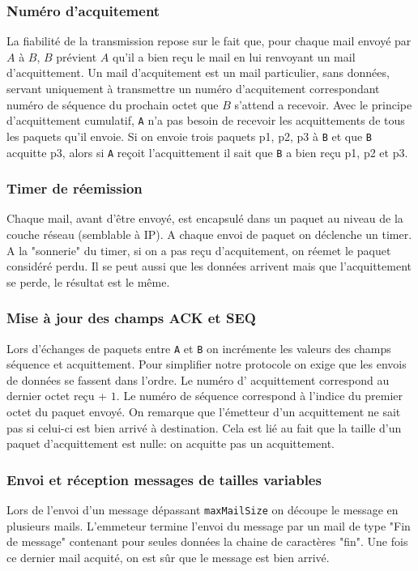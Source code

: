 \documentclass[11pt]{article}
\theoremstyle{definition}
\theoremstyle{definition}
\begin{document}
\subsubsection{Numéro d'acquitement}
La fiabilité de la transmission repose sur le fait que, pour chaque mail envoyé par $A$ à $B$, $B$ prévient $A$ qu'il a bien reçu le mail en lui renvoyant un mail d'acquittement.
Un mail d'acquitement est un mail particulier, sans données, servant uniquement à transmettre un numéro d'acquitement correspondant numéro de séquence du prochain octet que $B$ s'attend a recevoir.
Avec le principe d'acquittement cumulatif, \texttt{A} n'a pas besoin de recevoir les acquittements de tous les paquets qu'il envoie. Si on envoie trois paquets p1, p2, p3 à \texttt{B} et que \texttt{B}
acquitte p3, alors si \texttt{A} reçoit l'acquittement il sait que \texttt{B} a bien reçu p1, p2 et p3.

\subsubsection{Timer de réemission}
Chaque mail, avant d'être envoyé, est encapsulé dans un paquet au niveau de la couche réseau (semblable à IP).
A chaque envoi de paquet on déclenche un timer.
A la "sonnerie" du timer, si on a pas reçu d'acquitement, on réemet le paquet considéré perdu.
Il se peut aussi que les données arrivent mais que l'acquittement se perde, le résultat est le même. 

\subsubsection{Mise à jour des champs ACK et SEQ}
Lors d'échanges de paquets entre \texttt{A} et \texttt{B} on incrémente les valeurs des champs séquence et acquittement.
Pour simplifier notre protocole on exige que les envois de données se fassent dans l'ordre. Le numéro d' acquittement correspond au dernier octet reçu + $1$. Le numéro de séquence correspond à l'indice du premier octet du paquet envoyé. 
On remarque que l'émetteur d'un acquittement ne sait pas si celui-ci est bien arrivé à destination. Cela est lié au fait que la taille d'un paquet d'acquittement est nulle: on acquitte pas un acquittement. 

\subsubsection{ Envoi et réception messages de tailles variables}
Lors de l'envoi d'un message dépassant \texttt{maxMailSize} on découpe le message en plusieurs mails.
L'emmeteur termine l'envoi du message par un mail de type "Fin de message" contenant pour seules données
la chaine de caractères "fin". Une fois ce dernier mail acquité, on est sûr que le message est bien arrivé.
\end{document}
